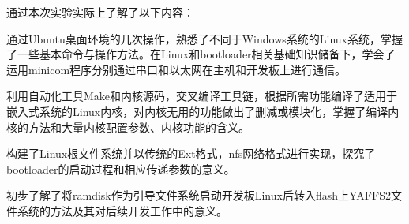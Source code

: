 \documentclass[hyperref,UTF8]{ctexart}
\begin{document}
通过本次实验实际上了解了以下内容：

通过Ubuntu桌面环境的几次操作，熟悉了不同于Windows系统的Linux系统，掌握了一些基本命令与操作方法。在Linux和bootloader相关基础知识储备下，学会了运用minicom程序分别通过串口和以太网在主机和开发板上进行通信。

利用自动化工具Make和内核源码，交叉编译工具链，根据所需功能编译了适用于嵌入式系统的Linux内核，对内核无用的功能做出了删减或模块化，掌握了编译内核的方法和大量内核配置参数、内核功能的含义。

构建了Linux根文件系统并以传统的Ext格式，nfs网络格式进行实现，探究了bootloader的启动过程和相应传递参数的意义。

初步了解了将ramdisk作为引导文件系统启动开发板Linux后转入flash上YAFFS2文件系统的方法及其对后续开发工作中的意义。
\end{document}
